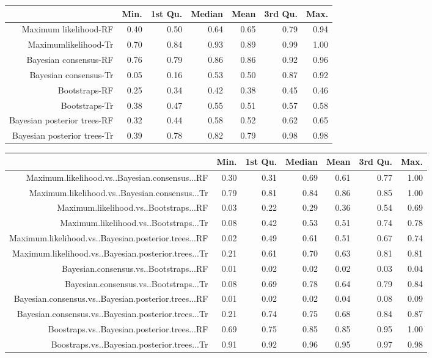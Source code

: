 \begin{table}[ht]
\centering
\begin{tabular}{rrrrrrr}
  \hline
 & Min. & 1st Qu. & Median & Mean & 3rd Qu. & Max. \\ 
  \hline
Maximum likelihood-RF & 0.40 & 0.50 & 0.64 & 0.65 & 0.79 & 0.94 \\ 
  Maximumlikelihood-Tr & 0.70 & 0.84 & 0.93 & 0.89 & 0.99 & 1.00 \\ 
  Bayesian consensus-RF & 0.76 & 0.79 & 0.86 & 0.86 & 0.92 & 0.96 \\ 
  Bayesian consensus-Tr & 0.05 & 0.16 & 0.53 & 0.50 & 0.87 & 0.92 \\ 
  Bootstraps-RF & 0.25 & 0.34 & 0.42 & 0.38 & 0.45 & 0.46 \\ 
  Bootstraps-Tr & 0.38 & 0.47 & 0.55 & 0.51 & 0.57 & 0.58 \\ 
  Bayesian posterior trees-RF & 0.32 & 0.44 & 0.58 & 0.52 & 0.62 & 0.65 \\ 
  Bayesian posterior trees-Tr & 0.39 & 0.78 & 0.82 & 0.79 & 0.98 & 0.98 \\ 
   \hline
\end{tabular}
\end{table}


\begin{table}[ht]
\centering
\begin{tabular}{rrrrrrr}
  \hline
 & Min. & 1st Qu. & Median & Mean & 3rd Qu. & Max. \\ 
  \hline
Maximum.likelihood.vs..Bayesian.consensus...RF & 0.30 & 0.31 & 0.69 & 0.61 & 0.77 & 1.00 \\ 
  Maximum.likelihood.vs..Bayesian.consensus...Tr & 0.79 & 0.81 & 0.84 & 0.86 & 0.85 & 1.00 \\ 
  Maximum.likelihood.vs..Bootstraps...RF & 0.03 & 0.22 & 0.29 & 0.36 & 0.54 & 0.69 \\ 
  Maximum.likelihood.vs..Bootstraps...Tr & 0.08 & 0.42 & 0.53 & 0.51 & 0.74 & 0.78 \\ 
  Maximum.likelihood.vs..Bayesian.posterior.trees...RF & 0.02 & 0.49 & 0.61 & 0.51 & 0.67 & 0.74 \\ 
  Maximum.likelihood.vs..Bayesian.posterior.trees...Tr & 0.21 & 0.61 & 0.70 & 0.63 & 0.81 & 0.81 \\ 
  Bayesian.consensus.vs..Bootstraps...RF & 0.01 & 0.02 & 0.02 & 0.02 & 0.03 & 0.04 \\ 
  Bayesian.consensus.vs..Bootstraps...Tr & 0.08 & 0.69 & 0.78 & 0.64 & 0.79 & 0.84 \\ 
  Bayesian.consensus.vs..Bayesian.posterior.trees...RF & 0.01 & 0.02 & 0.02 & 0.04 & 0.08 & 0.09 \\ 
  Bayesian.consensus.vs..Bayesian.posterior.trees...Tr & 0.21 & 0.74 & 0.75 & 0.68 & 0.84 & 0.87 \\ 
  Boostraps.vs..Bayesian.posterior.trees...RF & 0.69 & 0.75 & 0.85 & 0.85 & 0.95 & 1.00 \\ 
  Boostraps.vs..Bayesian.posterior.trees...Tr & 0.91 & 0.92 & 0.96 & 0.95 & 0.97 & 0.98 \\ 
   \hline
\end{tabular}
\end{table}

